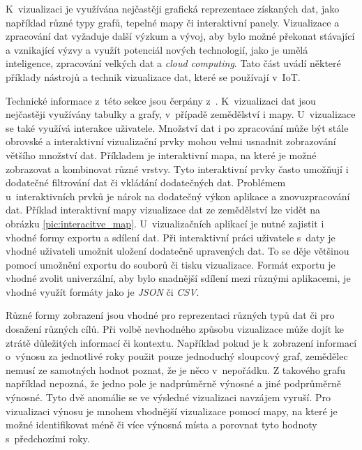 K~vizualizaci je využívána nejčastěji grafická reprezentace získaných dat, jako například různé typy grafů, tepelné mapy či interaktivní panely. Vizualizace a zpracování dat vyžaduje další výzkum a vývoj, aby bylo možné překonat stávající a vznikající výzvy a využít potenciál nových technologií, jako je umělá inteligence, zpracování velkých dat a \textit{cloud computing}. Tato část uvádí některé příklady nástrojů a technik vizualizace dat, které se používají v~IoT.

Technické informace z~této sekce jsou čerpány z~\cite{buyya2016big_POV5}. K~vizualizaci dat jsou nejčastěji využívány tabulky a grafy, v~případě zemědělství i mapy. U~vizualizace se také využívá interakce uživatele. Množství dat i po zpracování může být stále obrovské a interaktivní vizualizační prvky mohou velmi usnadnit zobrazování většího množství dat. Příkladem je interaktivní mapa, na které je možné zobrazovat a kombinovat různé vrstvy. Tyto interaktivní prvky často umožňují i dodatečné filtrování dat či vkládání dodatečných dat. Problémem u~interaktivních prvků je nárok na dodatečný výkon aplikace a znovuzpracování dat. Příklad interaktivní mapy vizualizace dat ze zemědělství lze vidět na obrázku \ref{pic:interacitve_map}.
U~vizualizačních aplikací je nutné zajistit i vhodné formy exportu a sdílení dat. Při interaktivní práci uživatele s~daty je vhodné uživateli umožnit uložení dodatečně upravených dat. To se děje většinou pomocí umožnění exportu do souborů či tisku vizualizace. Formát exportu je vhodné zvolit univerzální, aby bylo snadnější sdílení mezi různými aplikacemi, je vhodné využít formáty jako je \textit{JSON} či \textit{CSV}.


Různé formy zobrazení jsou vhodné pro reprezentaci různých typů dat či pro dosažení různých cílů. Při volbě nevhodného způsobu vizualizace může dojít ke ztrátě důležitých informací či kontextu. Například pokud je k~zobrazení informací o~výnosu za jednotlivé roky použit pouze jednoduchý sloupcový graf, zemědělec nemusí ze samotných hodnot poznat, že je něco v~nepořádku. Z takového grafu například nepozná, že jedno pole je nadprůměrně výnosné a jiné podprůměrně výnosné. Tyto dvě anomálie se ve výsledné vizualizaci navzájem vyruší. Pro vizualizaci výnosu je mnohem vhodnější vizualizace pomocí mapy, na které je možné identifikovat méně či více výnosná místa a porovnat tyto hodnoty s~předchozími roky.

